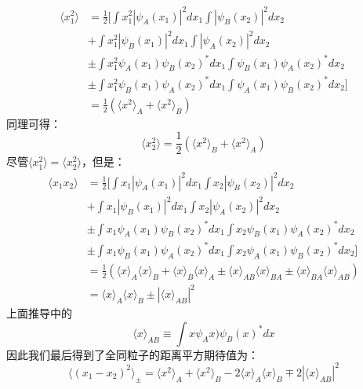 \begin{itemize}
\begin{align}
\langle x_1^2\rangle &= \frac{1}{2}\big[\int x_1^2|\psi_A(x_1)|^2dx_1\int |\psi_B(x_2)|^2dx_2\\
&+\int x_1^2|\psi_B(x_1)|^2dx_1\int |\psi_A(x_2)|^2dx_2\\ 
&\pm\int x_1^2\psi_A(x_1)\psi_B(x_2)^*dx_1\int \psi_B(x_1)\psi_A(x_2)^*dx_2\\
&\pm\int x_1^2\psi_B(x_1)\psi_A(x_2)^*dx_1\int \psi_A(x_1)\psi_B(x_2)^*dx_2\big]\\
&=\frac{1}{2}(\langle x^2\rangle_A+\langle x^2\rangle_B)
\end{align}
同理可得：
\begin{equation}
\langle x_2^2\rangle=\frac{1}{2}(\langle x^2\rangle_B+\langle x^2\rangle_A)
\end{equation}
尽管$\langle x_1^2\rangle=\langle x_2^2\rangle$，但是：
\begin{align}
\langle x_1x_2\rangle &= \frac{1}{2}\big[\int x_1|\psi_A(x_1)|^2dx_1\int x_2 |\psi_B(x_2)|^2dx_2\\
&+\int x_1|\psi_B(x_1)|^2dx_1\int x_2|\psi_A(x_2)|^2dx_2\\ 
&\pm\int x_1\psi_A(x_1)\psi_B(x_2)^*dx_1\int x_2\psi_B(x_1)\psi_A(x_2)^*dx_2\\
&\pm\int x_1\psi_B(x_1)\psi_A(x_2)^*dx_1\int x_2\psi_A(x_1)\psi_B(x_2)^*dx_2\big]\\
&=\frac{1}{2}\left(\langle x\rangle_A\langle x\rangle_B+\langle x\rangle_B\langle x\rangle_A\pm\langle x\rangle_{AB}\langle x\rangle_{BA}\pm\langle x\rangle_{BA}\langle x\rangle_{AB}\right)\\
&=\langle x\rangle_A\langle x\rangle_B\pm|\langle x\rangle_{AB}|^2
\end{align}
上面推导中的\begin{equation}
\langle x\rangle_{AB}\equiv \int x\psi_Ax)\psi_B(x)^*dx
\end{equation}
因此我们最后得到了全同粒子的距离平方期待值为：
\begin{equation}
\langle (x_1-x_2)^2\rangle_\pm=\langle x^2\rangle_A+\langle x^2\rangle_B-2\langle x\rangle_A\langle x\rangle_B\mp 2|\langle x\rangle_{AB}|^2
\end{equation}


\end{itemize}